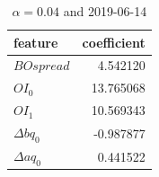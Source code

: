 \documentclass[english, 11pt, a4paper]{article}
\begin{document}
\begin{table}[H]
    \centering
    \begin{tabular}{lr}
    \toprule
    feature & coefficient \\
    \midrule
    $BOspread$ & 4.542120 \\
    $OI_0$ & 13.765068 \\
    $OI_1$ & 10.569343 \\
    $\Delta bq_0$ & -0.987877 \\
    $\Delta aq_0$ & 0.441522 \\
    \bottomrule
    \end{tabular}
    \caption{ $\alpha = 0.04$ and 2019-06-14}
\end{table}


%
\end{document}
